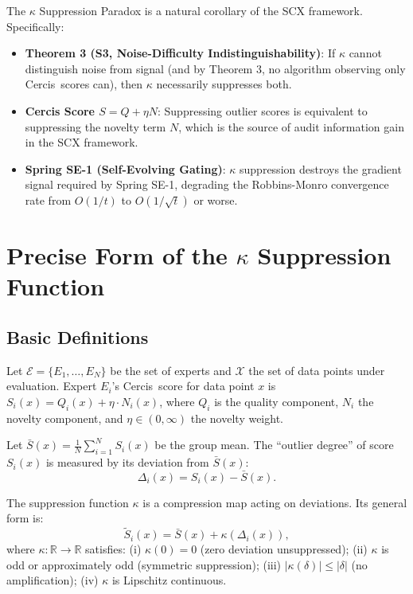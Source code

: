 \documentclass[12pt,a4paper]{article}
\theoremstyle{definition}
\newcommand{\R}{\mathbb{R}}
\newcommand{\Cercis}{\textsf{Cercis}}
\newcommand{\calX}{\mathcal{X}}
\newcommand{\calE}{\mathcal{E}}
\begin{document}
The $\kappa$ Suppression Paradox is a natural corollary of the SCX framework. Specifically:
\begin{itemize}
    \item \textbf{Theorem 3 (S3, Noise-Difficulty Indistinguishability)}: If $\kappa$ cannot distinguish noise from signal (and by Theorem 3, no algorithm observing only \Cercis~scores can), then $\kappa$ necessarily suppresses both.
    \item \textbf{Cercis Score $S = Q + \eta N$}: Suppressing outlier scores is equivalent to suppressing the novelty term $N$, which is the source of audit information gain in the SCX framework.
    \item \textbf{Spring SE-1 (Self-Evolving Gating)}: $\kappa$ suppression destroys the gradient signal required by Spring SE-1, degrading the Robbins-Monro convergence rate from $O(1/t)$ to $O(1/\sqrt{t})$ or worse.
\end{itemize}

\section{Precise Form of the $\kappa$ Suppression Function}
\label{sec:kappa_form}

\subsection{Basic Definitions}

Let $\calE = \{E_1, \ldots, E_N\}$ be the set of experts and $\calX$ the set of data points under evaluation. Expert $E_i$'s \Cercis~score for data point $x$ is $S_i(x) = Q_i(x) + \eta \cdot N_i(x)$, where $Q_i$ is the quality component, $N_i$ the novelty component, and $\eta \in (0, \infty)$ the novelty weight.

Let $\bar{S}(x) = \frac{1}{N}\sum_{i=1}^N S_i(x)$ be the group mean. The ``outlier degree'' of score $S_i(x)$ is measured by its deviation from $\bar{S}(x)$:
\begin{equation}
    \Delta_i(x) = S_i(x) - \bar{S}(x).
\end{equation}

The suppression function $\kappa$ is a compression map acting on deviations. Its general form is:
\begin{equation}
    \tilde{S}_i(x) = \bar{S}(x) + \kappa(\Delta_i(x)),
\end{equation}
where $\kappa: \R \to \R$ satisfies: (i) $\kappa(0) = 0$ (zero deviation unsuppressed); (ii) $\kappa$ is odd or approximately odd (symmetric suppression); (iii) $|\kappa(\delta)| \leq |\delta|$ (no amplification); (iv) $\kappa$ is Lipschitz continuous.
\end{document}
